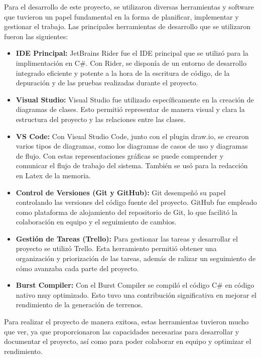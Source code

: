 Para el desarrollo de este proyecto, se utilizaron diversas herramientas y software que tuvieron un papel fundamental en la forma de planificar, implementar y gestionar el trabajo. Las principales herramientas de desarrollo que se utilizaron fueron las siguientes:

\begin{itemize}
    \item \textbf{IDE Principal:} JetBrains Rider fue el IDE principal que se utilizó para la implimentación en C\#. Con Rider, se disponía de un entorno de desarrollo integrado eficiente y potente a la hora de la escritura de código, de la depuración y  de las pruebas realizadas durante el proyecto.
    
    \item \textbf{Visual Studio:} Visual Studio fue utilizado específicamente en la creación de diagramas de clases. Esto permitió representar de manera visual y clara la estructura del proyecto y las relaciones entre las clases.
    
    \item \textbf{VS Code:} Con Visual Studio Code, junto con el plugin draw.io, se crearon varios tipos de diagramas, como los diagramas de casos de uso y diagramas de flujo. Con estas representaciones gráficas se puede comprender y comunicar el flujo de trabajo del sistema. También se usó para la redacción en Latex de la memoria.
        
    \item \textbf{Control de Versiones (Git y GitHub):} Git desempeñó su papel controlando las versiones del código fuente del proyecto. GitHub fue empleado como plataforma de alojamiento del repositorio de Git, lo que facilitó la colaboración en equipo y el seguimiento de cambios.
    
    \item \textbf{Gestión de Tareas (Trello):} Para gestionar las tareas y desarrollar el proyecto se utilizó Trello. Esta herramiento permitió obtener una organización y priorización de las tareas, además de ralizar un seguimiento de cómo avanzaba cada parte del proyecto.

    \item \textbf{Burst Compiler:} Con el Burst Compiler se compiló el código C\# en código nativo muy optimizado. Esto tuvo una contribución significativa en mejorar el rendimiento de la generación de terrenos.
\end{itemize}

Para realizar el proyecto de manera exitosa, estas herramientas tuvieron mucho que ver, ya que proporcionaron las capacidades necesarias para desarrollar y documentar el proyecto, así como para poder colaborar en equipo y optimizar el rendimiento.


